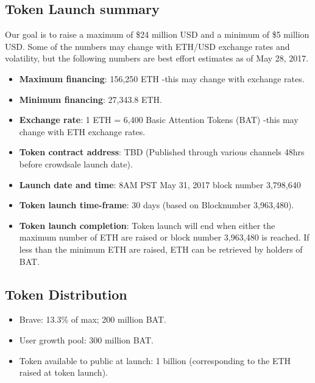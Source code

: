 \documentclass[11pt]{article}
\begin{document}
\subsection{Token Launch summary}
\label{sec-6-1}
{Our goal is to raise a maximum of \$24 million USD and a minimum of \$5 million USD. Some of the numbers may change with ETH/USD exchange rates and volatility, but the following numbers are best effort estimates as of May 28, 2017. }%

\begin{itemize}
\item{\textbf{Maximum financing}: 156,250 ETH -this may change with exchange rates.}
\item{\textbf{Minimum financing}: 27,343.8 ETH.}
\item{\textbf{Exchange rate}: 1 ETH = 6,400 Basic Attention Tokens (\textrm{BAT}) -this may change with ETH exchange rates.}
\item{\textbf{Token contract address}: TBD (Published through various channels 48hrs before crowdsale launch date).}
\item{\textbf{Launch date and time}: 8AM PST May 31, 2017 block number 3,798,640}
\item{\textbf{Token launch time-frame}: 30 days (based on Blocknumber 3,963,480).}
\item{\textbf{Token launch completion}: Token launch will end when either the maximum number of ETH are raised or block number 3,963,480 is reached. If less than the minimum ETH are raised, ETH can be retrieved by holders of BAT.}
\end{itemize}
\subsection{Token Distribution}
\label{sec-6-2}

\begin{itemize}
\item{Brave: 13.3\% of max; 200 million \textrm{BAT}.}
\item{User growth pool: 300 million \textrm{BAT}.}
\item{Token available to public at launch: 1 billion (corresponding to the ETH raised at token launch).}
\end{itemize}
\end{document}
